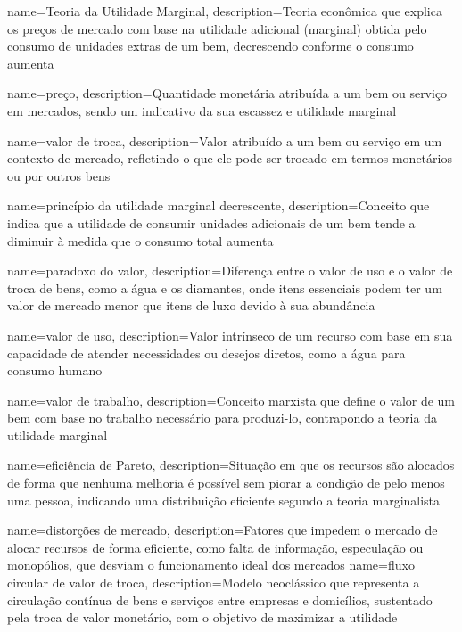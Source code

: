 {
	name=Teoria da Utilidade Marginal,
	description={Teoria econômica que explica os preços de mercado com base na utilidade adicional (marginal) obtida pelo consumo de unidades extras de um bem, decrescendo conforme o consumo aumenta}
}

{
	name=preço,
	description={Quantidade monetária atribuída a um bem ou serviço em mercados, sendo um indicativo da sua escassez e utilidade marginal}
}

{
	name=valor de troca,
	description={Valor atribuído a um bem ou serviço em um contexto de mercado, refletindo o que ele pode ser trocado em termos monetários ou por outros bens}
}

{
	name=princípio da utilidade marginal decrescente,
	description={Conceito que indica que a utilidade de consumir unidades adicionais de um bem tende a diminuir à medida que o consumo total aumenta}
}

{
	name=paradoxo do valor,
	description={Diferença entre o valor de uso e o valor de troca de bens, como a água e os diamantes, onde itens essenciais podem ter um valor de mercado menor que itens de luxo devido à sua abundância}
}

{
	name=valor de uso,
	description={Valor intrínseco de um recurso com base em sua capacidade de atender necessidades ou desejos diretos, como a água para consumo humano}
}

{
	name=valor de trabalho,
	description={Conceito marxista que define o valor de um bem com base no trabalho necessário para produzi-lo, contrapondo a teoria da utilidade marginal}
}

{
	name=eficiência de Pareto,
	description={Situação em que os recursos são alocados de forma que nenhuma melhoria é possível sem piorar a condição de pelo menos uma pessoa, indicando uma distribuição eficiente segundo a teoria marginalista}
}

{
	name=distorções de mercado,
	description={Fatores que impedem o mercado de alocar recursos de forma eficiente, como falta de informação, especulação ou monopólios, que desviam o funcionamento ideal dos mercados}
}
{
	name=fluxo circular de valor de troca,
	description={Modelo neoclássico que representa a circulação contínua de bens e serviços entre empresas e domicílios, sustentado pela troca de valor monetário, com o objetivo de maximizar a utilidade}
}

